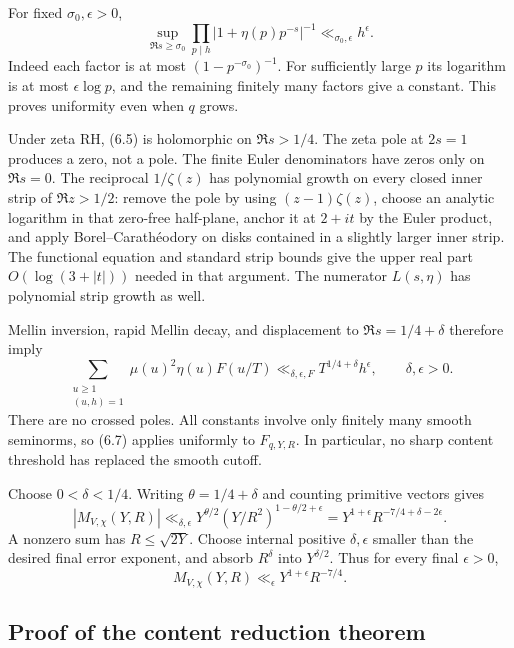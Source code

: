 \documentclass[11pt]{article}
\begin{document}
For fixed $\sigma_0,\epsilon>0$,
\[
 \sup_{\Re s\ge\sigma_0}
   \prod_{p\mid h}|1+\eta(p)p^{-s}|^{-1}
       \ll_{\sigma_0,\epsilon}h^\epsilon.                 \tag{6.6}
\]
Indeed each factor is at most $(1-p^{-\sigma_0})^{-1}$.
For sufficiently large $p$ its logarithm is at most
$\epsilon\log p$, and the remaining finitely many factors
give a constant. This proves uniformity even when $q$ grows.

Under zeta RH, (6.5) is holomorphic on $\Re s>1/4$.
The zeta pole at $2s=1$ produces a zero, not a pole.
The finite Euler denominators have zeros only on $\Re s=0$.
The reciprocal $1/\zeta(z)$ has polynomial growth on every
closed inner strip of $\Re z>1/2$: remove the pole by using
$(z-1)\zeta(z)$, choose an analytic logarithm in that zero-free
half-plane, anchor it at $2+it$ by the Euler product, and
apply Borel--Carath\'eodory on disks contained in a slightly
larger inner strip. The functional equation and standard
strip bounds give the upper real part
$O(\log(3+|t|))$ needed in that argument.
The numerator $L(s,\eta)$ has polynomial strip growth as well.

Mellin inversion, rapid Mellin decay, and displacement to
$\Re s=1/4+\delta$ therefore imply
\[
 \sum_{\substack{u\ge1\\(u,h)=1}}\mu(u)^2\eta(u)F(u/T)
       \ll_{\delta,\epsilon,F}T^{1/4+\delta}h^\epsilon,
             \qquad \delta,\epsilon>0.                  \tag{6.7}
\]
There are no crossed poles. All constants involve only
finitely many smooth seminorms, so (6.7) applies uniformly
to $F_{q,Y,R}$. In particular, no sharp content threshold
has replaced the smooth cutoff.

Choose $0<\delta<1/4$. Writing $\theta=1/4+\delta$ and
counting primitive vectors gives
\[
 |M_{V,\chi}(Y,R)|
 \ll_{\delta,\epsilon}
    Y^{\theta/2}(Y/R^2)^{1-\theta/2+\epsilon}
 =Y^{1+\epsilon}R^{-7/4+\delta-2\epsilon}.
\]
A nonzero sum has $R\le\sqrt{2Y}$. Choose internal positive
$\delta,\epsilon$ smaller than the desired final error
exponent, and absorb $R^\delta$ into $Y^{\delta/2}$.
Thus for every final $\epsilon>0$,
\[
                M_{V,\chi}(Y,R)
                    \ll_\epsilon Y^{1+\epsilon}R^{-7/4}.
                                                               \tag{6.8}
\]

\subsection{Proof of the content reduction theorem}
\end{document}
